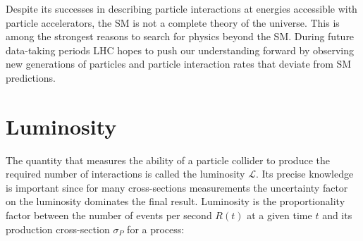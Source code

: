 Despite its successes in describing particle interactions at energies accessible with particle accelerators, the SM is not a complete theory of the universe. This is among the strongest reasons to search for physics beyond the SM. During future data-taking periods LHC hopes to push our understanding forward by observing new generations of particles and particle interaction rates that deviate from SM predictions.




%






\section{Luminosity}

The quantity that measures the ability of a particle collider to produce the required number of interactions is called the luminosity $\mathcal{L}$. Its precise knowledge is important since for many cross-sections measurements the uncertainty factor on the luminosity dominates the final result. Luminosity is the proportionality factor between the number of events per second $R(t)$ at a given time $t$ and its production cross-section $\sigma_{P}$ for a process:

